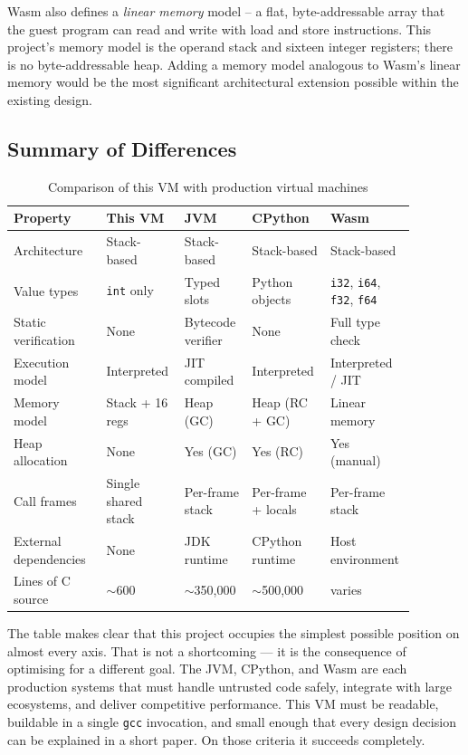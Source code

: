 Wasm also defines a \textit{linear memory} model – a flat, byte-addressable array that the guest program can read and write with load and store instructions. This project's memory model is the operand stack and sixteen integer registers; there is no byte-addressable heap. Adding a memory model analogous to Wasm's linear memory would be the most significant architectural extension possible within the existing design.

\subsection{Summary of Differences}

\begin{table}[H]
\centering
\small
\setlength{\tabcolsep}{4pt}
\renewcommand{\arraystretch}{1.15}
\caption{Comparison of this VM with production virtual machines}
\label{tab:vm-comparison}
\begin{tabular}{@{}p{0.22\linewidth}p{0.16\linewidth}p{0.16\linewidth}p{0.18\linewidth}p{0.16\linewidth}@{}}
\toprule
\textbf{Property} & \textbf{This VM} & \textbf{JVM} & \textbf{CPython} & \textbf{Wasm} \\
\midrule
Architecture          & Stack-based & Stack-based & Stack-based & Stack-based \\
Value types           & \texttt{int} only & Typed slots & Python objects & \texttt{i32}, \texttt{i64}, \texttt{f32}, \texttt{f64} \\
Static verification   & None & Bytecode verifier & None & Full type check \\
Execution model       & Interpreted & JIT compiled & Interpreted & Interpreted / JIT \\
Memory model          & Stack + 16 regs & Heap (GC) & Heap (RC + GC) & Linear memory \\
Heap allocation       & None & Yes (GC) & Yes (RC) & Yes (manual) \\
Call frames           & Single shared stack & Per-frame stack & Per-frame + locals & Per-frame stack \\
External dependencies & None & JDK runtime & CPython runtime & Host environment \\
Lines of C source     & $\sim$600 & $\sim$350,000 & $\sim$500,000 & varies \\
\bottomrule
\end{tabular}
\end{table}

The table makes clear that this project occupies the simplest possible position on almost every axis. That is not a shortcoming — it is the consequence of optimising for a different goal. The JVM, CPython, and Wasm are each production systems that must handle untrusted code safely, integrate with large ecosystems, and deliver competitive performance. This VM must be readable, buildable in a single \texttt{gcc} invocation, and small enough that every design decision can be explained in a short paper. On those criteria it succeeds completely.

